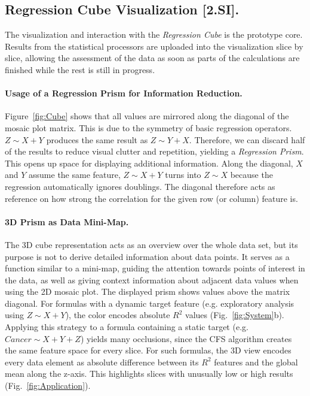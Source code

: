 \documentclass[journal]{style/vgtc} 			          %
\newcommand{\com}[1]{\textcolor{orange}{\uline{#1}}}
\begin{document}

\subsection{Regression Cube Visualization [2.SI].}
The visualization and interaction with the \emph{Regression Cube} is the prototype core.
Results from the statistical processors are uploaded into the visualization slice by slice, allowing the assessment of the data as soon as parts of the calculations are finished while the rest is still in progress.

\paragraph{Usage of a Regression Prism for Information Reduction.}
Figure~\ref{fig:Cube} shows that all values are mirrored along the diagonal of the mosaic plot matrix.
This is due to the symmetry of basic regression operators.
$Z \sim X + Y$ produces the same result as $Z \sim Y + X$.
Therefore, we can discard half of the results to reduce visual clutter and repetition, yielding a \emph{Regression Prism}.
This opens up space for displaying additional information.
Along the diagonal, $X$ and $Y$ assume the same feature, $Z \sim X + Y$ turns into $Z \sim X$ because the regression automatically ignores doublings.
The diagonal therefore acts as reference on how strong the correlation for the given row (or column) feature is.

\paragraph{3D Prism as Data Mini-Map.}
The 3D cube representation acts as an overview over the whole data set, but its purpose is not to derive detailed information about data points.
It serves as a function similar to a mini-map, guiding the attention towards points of interest in the data, as well as giving context information about adjacent data values when using the 2D mosaic plot.
The displayed prism shows values above the matrix diagonal.
For formulas with a dynamic target feature (e.g. exploratory analysis using $Z \sim X + Y$), the color encodes absolute $R^2$ values (Fig.~\ref{fig:System}b).
Applying this strategy to a formula containing a static target (e.g. $Cancer \sim X + Y + Z$) yields many occlusions, since the CFS algorithm creates the same feature space for every slice.
For such formulas, the 3D view encodes every data element as absolute difference between its $R^2$ features and the global mean along the z-axis.
This highlights slices with unusually low or high results (Fig.~\ref{fig:Application}).
\end{document}
